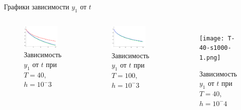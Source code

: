 \documentclass[ignoreonframetext,unicode]{beamer}
\begin{document}
\begin{frame}{Графики зависимости $y_1$ от $t$}
	\begin{columns}
		
	\begin{figure}[!htbp]
		\centering
		\includegraphics[width=0.9\textwidth]{T40-1}%
		\caption{Зависимость $y_1$ от $t$ при $T = 40$, $h = 10^-3$}
		\vspace*{-2mm}
		\label{T40-1}
	\end{figure}

	\begin{figure}[!htbp]
		\centering
		\includegraphics[width=0.9\textwidth]{T100-1}%
		\caption{Зависимость $y_1$ от $t$ при $T = 100$, $h = 10^-3$}
		\vspace*{-2mm}
		\label{T100-1}
	\end{figure}

	\begin{figure}[!htbp]
		\centering
		\texttt{[image: T-40-s1000-1.png]}%
		\caption{Зависимость $y_1$ от $t$ при $T = 40$, $h = 10^-4$}
		\vspace*{-2mm}
		\label{T-40-s1000-1.png}
	\end{figure}


\end{columns}
\end{frame}
\end{document}
